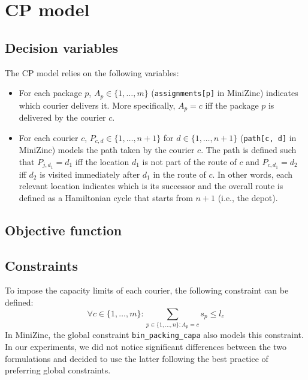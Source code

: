 \section{CP model}


\subsection{Decision variables}

The CP model relies on the following variables:
\begin{itemize}
    \item For each package $p$, $A_p \in \{ 1, \dots, m \}$ (\texttt{assignments[p]} in MiniZinc) indicates which courier delivers it. More specifically, $A_p = c$ iff the package $p$ is delivered by the courier $c$.
    
    \item For each courier $c$, $P_{c, d} \in \{ 1, \dots, n+1 \}$ for $d \in \{ 1, \dots, n+1 \}$ (\texttt{path[c, d]} in MiniZinc) models the path taken by the courier $c$. The path is defined such that $P_{j, d_1} = d_1$ iff the location $d_1$ is not part of the route of $c$ and $P_{c, d_1} = d_2$ iff $d_2$ is visited immediately after $d_1$ in the route of $c$. In other words, each relevant location indicates which is its successor and the overall route is defined as a Hamiltonian cycle that starts from $n+1$ (i.e., the depot).
\end{itemize}



\subsection{Objective function}



\subsection{Constraints}

To impose the capacity limits of each courier, the following constraint can be defined:
\begin{equation}
    \forall c \in \{ 1, \dots, m \}: \sum_{p \in \{1, \dots, n\}: A_p = c} s_p \leq l_c 
\end{equation}
In MiniZinc, the global constraint \texttt{bin\_packing\_capa} also models this constraint. In our experiments, we did not notice significant differences between the two formulations and decided to use the latter following the best practice of preferring global constraints.

